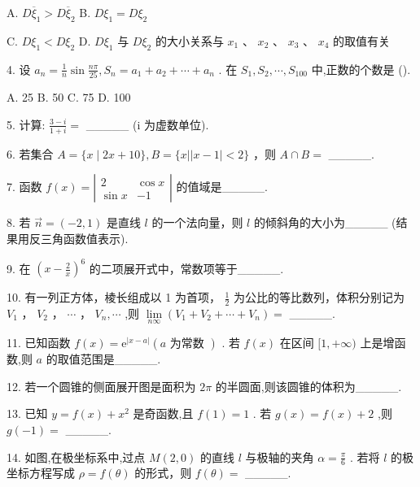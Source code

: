\documentclass[10pt]{article}
\begin{document}
A. \(D{\overline{\xi }}_{1} > D{\overline{\xi }}_{2}\) B. \(D{\xi }_{1} = D{\xi }_{2}\)

C. \(D{\xi }_{1} < D{\xi }_{2}\) D. \(D{\xi }_{1}\) 与 \(D{\xi }_{2}\) 的大小关系与 \({x}_{1}\text{ 、 }{x}_{2}\text{ 、 }{x}_{3}\text{ 、 }{x}_{4}\) 的取值有关

4. 设 \({a}_{n} = \frac{1}{n}\sin \frac{n\pi }{25},{S}_{n} = {a}_{1} + {a}_{2} + \cdots  + {a}_{n}\) . 在 \({S}_{1},{S}_{2},\cdots ,{S}_{100}\) 中,正数的个数是 ().

A. 25 B. 50 C. 75 D. 100

5. 计算: \(\frac{3 - i}{1 + i} =\) \_\_\_\_\_ (i 为虚数单位).

6. 若集合 \(A = \{ x \mid  {2x} + {10}\} ,B = \{ x\left| \right| x - 1 \mid   < 2\}\) ，则 \(A \cap  B =\) \_\_\_\_\_.

7. 函数 \(f\left( x\right)  = \left| \begin{matrix} 2 & \cos x \\  \sin x &  - 1 \end{matrix}\right|\) 的值域是\_\_\_\_\_.

8. 若 \(\overrightarrow{n} = \left( {-2,1}\right)\) 是直线 \(l\) 的一个法向量，则 \(l\) 的倾斜角的大小为\_\_\_\_\_ (结果用反三角函数值表示).

9. 在 \({\left( x - \frac{2}{x}\right) }^{6}\) 的二项展开式中，常数项等于\_\_\_\_\_.

10. 有一列正方体，棱长组成以 1 为首项， \(\frac{1}{2}\) 为公比的等比数列，体积分别记为 \({V}_{1}\) ， \({V}_{2}\) ， \(\cdots\) ， \({V}_{n},\cdots\) ,则 \(\mathop{\lim }\limits_{{n\infty }}\left( {{V}_{1} + {V}_{2} + \cdots  + {V}_{n}}\right)  =\) \_\_\_\_\_.

11. 已知函数 \(f\left( x\right)  = {\mathrm{e}}^{\left| x - a\right| }\left( {a\text{ 为常数 }}\right)\) . 若 \(f\left( x\right)\) 在区间 \(\lbrack 1, + \infty )\) 上是增函数,则 \(a\) 的取值范围是\_\_\_\_\_.

12. 若一个圆锥的侧面展开图是面积为 \({2\pi }\) 的半圆面,则该圆锥的体积为\_\_\_\_\_.

13. 已知 \(y = f\left( x\right)  + {x}^{2}\) 是奇函数,且 \(f\left( 1\right)  = 1\) . 若 \(g\left( x\right)  = f\left( x\right)  + 2\) ,则 \(g\left( {-1}\right)  =\) \_\_\_\_\_.

14. 如图,在极坐标系中,过点 \(M\left( {2,0}\right)\) 的直线 \(l\) 与极轴的夹角 \(\alpha  = \frac{\pi }{6}\) . 若将 \(l\) 的极坐标方程写成 \(\rho  = f\left( \theta \right)\) 的形式，则 \(f\left( \theta \right)  =\) \_\_\_\_\_.
\end{document}
